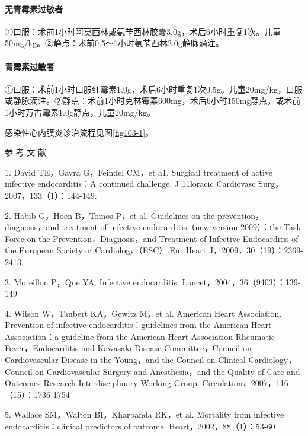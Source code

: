 \paragraph{无青霉素过敏者}

①口服：术前1小时阿莫西林或氨苄西林胶囊3.0g，术后6小时重复1次。儿童50mg/kg。②静点：术前0.5～1小时氨苄西林2.0g静脉滴注。

\paragraph{青霉素过敏者}

①口服：术前1小时口服红霉素1.0g，术后6小时重复1次0.5g。儿童20mg/kg，口服或静脉滴注。②静点：术前1小时克林霉素600mg，术后6小时150mg静点，或术前1小时万古霉素1.0g静点，儿童20mg/kg。

感染性心内膜炎诊治流程见图\ref{fig103-1}。

\protect\hypertarget{text00301.html}{}{}

\hypertarget{text00301.htmlux5cux23CHP10-3-6}{}
参 考 文 献

1. David TE，Gavra G，Feindel CM，et a1. Surgical treatment of active
infective endocarditis：A continued challenge. J 11loracic Cardiovasc
Surg，2007，133（1）：144-149.

2. Habib G，Hoen B，Tomos P，et al. Guidelines on the
prevention，diagnosis，and treatment of infective endocarditis（new
version 2009）：the Task Force on the Prevention，Diagnosis，and
Treatment of Infective Endocarditis of the European Society of
Cardiology（ESC）.Eur Heart J，2009，30（19）：2369-2413.

3. Moreillon P，Que YA. Infective endocarditis.
Lancet，2004，36（9403）：139-149

4. Wilson W，Taubert KA，Gewitz M，et al. American Heart Association.
Prevention of infective endocarditis：guidelines from the American Heart
Association：a guideline from the American Heart Association Rheumatic
Fever，Endocarditis and Kawasaki Disease Committee，Council on
Cardiovascular Disease in the Young，and the Council on Clinical
Cardiology，Council on Cardiovascular Surgery and Anesthesia，and the
Quality of Care and Outcomes Research Interdisciplinary Working Group.
Circulation，2007，116（15）：1736-1754

5. Wallace SM，Walton BI，Kharbanda RK，et al. Mortality from infective
endocarditis：clinical predictors of outcome.
Heart，2002，88（1）：53-60

\protect\hypertarget{text00302.html}{}{}

